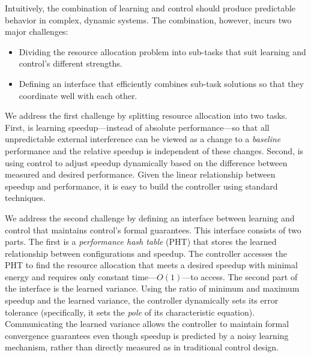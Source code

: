 Intuitively, the combination of learning and control should produce
predictable behavior in complex, dynamic systems.  The combination,
however, incurs two major challenges:
\begin{itemize}[leftmargin=1em]
\item Dividing the resource allocation problem into sub-tasks that
  suit learning and control's different strengths.
\item Defining an interface that efficiently combines sub-task
  solutions so that they coordinate well with each other.
\end{itemize}

We address the first challenge by splitting resource allocation into
two tasks.  First, is learning speedup---instead of absolute
performance---so that all unpredictable external interference can be
viewed as a change to a \emph{baseline} performance and the relative
speedup is independent of these changes.    Second, is
using control to adjust speedup dynamically based on the difference
between measured and desired performance. Given the linear
relationship between speedup and performance, it is easy to build the
controller using standard techniques. 

We address the second challenge by defining an interface between
learning and control that maintains control's formal guarantees.  This
interface consists of two parts.  The first is a \emph{performance
  hash table} (PHT) that stores the learned relationship between
configurations and speedup.  The controller accesses the PHT to find
the resource allocation that meets a desired speedup with minimal
energy and requires only constant time---$O(1)$---to access.  The
second part of the interface is the learned variance.  Using the ratio
of minimum and maximum speedup and the learned variance, the
controller dynamically sets its error tolerance (specifically, it sets
the \emph{pole} of its characteristic equation).  Communicating the
learned variance allows the controller to maintain formal convergence
guarantees even though speedup is predicted by a noisy learning
mechanism, rather than directly measured as in traditional control
design.

